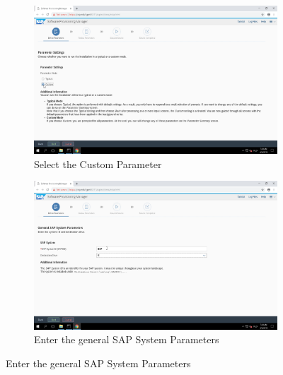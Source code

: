 \begin{figure}[!htb]\ContinuedFloat
    \begin{subfigure}{0.5\textwidth}
        \captionsetup{width=0.8\linewidth}
        \includegraphics[width=0.9\linewidth]{img/Methodologie/SAP34.png}
        \centering
        \caption{Select the Custom Parameter}
    \end{subfigure}
    \begin{subfigure}{0.5\textwidth}
        \captionsetup{width=0.8\linewidth}
        \includegraphics[width=0.9\linewidth]{img/Methodologie/SAP33.png} 
        \centering
        \caption{Enter the general SAP System Parameters}
    \end{subfigure}
\end{figure}
